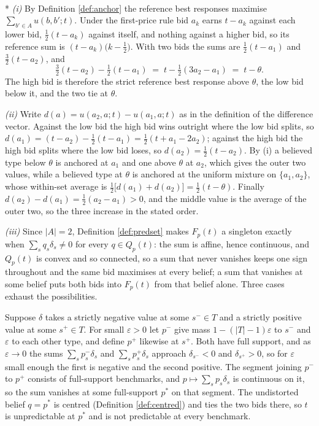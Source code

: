 \documentclass[12pt]{article}
\makeatletter
\theoremstyle{definition}
\renewenvironment{proof}[1][\proofname]{\par
  \pushQED{\qed}%
  \normalfont \topsep6\p@\@plus6\p@\relax
  \trivlist
  \item[\hskip\labelsep\itshape #1\@addpunct{.}]\mbox{}\\*
  \ignorespaces
}{%
  \popQED\endtrivlist\@endpefalse
}
\makeatother
\begin{document}
\begin{proof}[Proof of Corollary \ref{prop:cap}]\emph{(i)} By Definition \ref{def:anchor} the reference best responses maximise $\sum_{b' \in A} u(b, b'; t)$. Under the first-price rule bid $a_k$ earns $t - a_k$ against each lower bid, $\tfrac12 (t - a_k)$ against itself, and nothing against a higher bid, so its reference sum is $(t - a_k)\bigl(k - \tfrac12\bigr)$. With two bids the sums are $\tfrac12 (t - a_1)$ and $\tfrac32 (t - a_2)$, and
\[
\tfrac32 (t - a_2) - \tfrac12 (t - a_1) \;=\; t - \tfrac12 (3a_2 - a_1) \;=\; t - \theta .
\]
The high bid is therefore the strict reference best response above $\theta$, the low bid below it, and the two tie at $\theta$.

\emph{(ii)} Write $d(a) = u(a_2, a; t) - u(a_1, a; t)$ as in the definition of the difference vector. Against the low bid the high bid wins outright where the low bid splits, so $d(a_1) = (t - a_2) - \tfrac12 (t - a_1) = \tfrac12 (t + a_1 - 2a_2)$; against the high bid the high bid splits where the low bid loses, so $d(a_2) = \tfrac12 (t - a_2)$. By (i) a believed type below $\theta$ is anchored at $a_1$ and one above $\theta$ at $a_2$, which gives the outer two values, while a believed type at $\theta$ is anchored at the uniform mixture on $\{a_1, a_2\}$, whose within-set average is $\tfrac12\bigl[d(a_1) + d(a_2)\bigr] = \tfrac12 (t - \theta)$. Finally $d(a_2) - d(a_1) = \tfrac12 (a_2 - a_1) > 0$, and the middle value is the average of the outer two, so the three increase in the stated order.

\emph{(iii)} Since $|A| = 2$, Definition \ref{def:predset} makes $F_p(t)$ a singleton exactly when $\sum_s q_s \delta_s \neq 0$ for every $q \in Q_p(t)$: the sum is affine, hence continuous, and $Q_p(t)$ is convex and so connected, so a sum that never vanishes keeps one sign throughout and the same bid maximises at every belief; a sum that vanishes at some belief puts both bids into $F_p(t)$ from that belief alone. Three cases exhaust the possibilities.

Suppose $\delta$ takes a strictly negative value at some $s^- \in T$ and a strictly positive value at some $s^+ \in T$. For small $\varepsilon > 0$ let $p^-$ give mass $1 - (|T| - 1)\varepsilon$ to $s^-$ and $\varepsilon$ to each other type, and define $p^+$ likewise at $s^+$. Both have full support, and as $\varepsilon \to 0$ the sums $\sum_s p^-_s \delta_s$ and $\sum_s p^+_s \delta_s$ approach $\delta_{s^-} < 0$ and $\delta_{s^+} > 0$, so for $\varepsilon$ small enough the first is negative and the second positive. The segment joining $p^-$ to $p^+$ consists of full-support benchmarks, and $p \mapsto \sum_s p_s \delta_s$ is continuous on it, so the sum vanishes at some full-support $p^\ast$ on that segment. The undistorted belief $q = p^\ast$ is centred (Definition \ref{def:centred}) and ties the two bids there, so $t$ is unpredictable at $p^\ast$ and is not predictable at every benchmark.


\end{proof}
\end{document}
